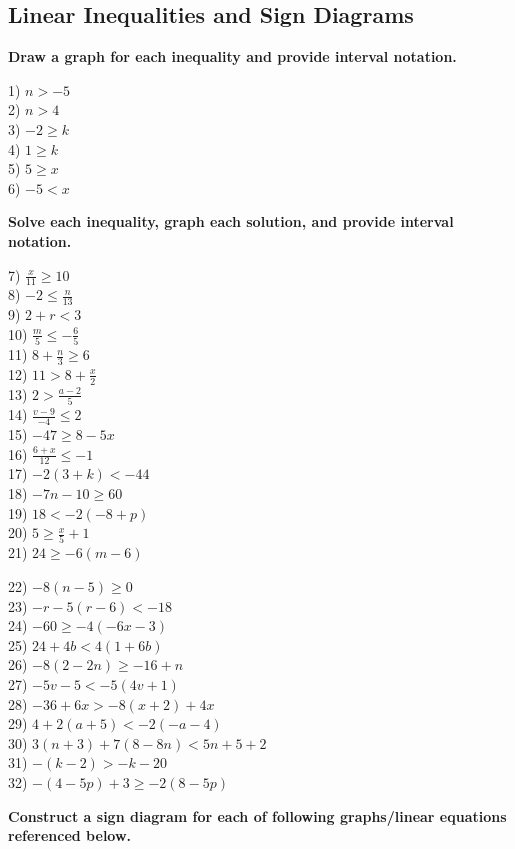 \documentclass[12pt]{book}
\theoremstyle{definition}
\begin{document}
\subsection*{Linear Inequalities and Sign Diagrams}
{\bf Draw a graph for each inequality and provide interval notation.}
\begin{multicols}{3}
  1) $n > - 5$\\
  2) $n > 4$\\
  3) $- 2 \geq k$\\
  4) $1 \geq k$\\
  5) $5 \geq x$\\
  6) $- 5 < x$
\end{multicols}
{\bf Solve each inequality, graph each solution, and provide interval
notation.}
\begin{multicols}{3}
  7) $\frac{x}{11} \geq 10$\\
  8) $- 2 \leq \frac{n}{13}$\\
  9) $2 + r < 3$\\
  10) $\frac{m}{5} \leq - \frac{6}{5}$\\
  11) $8 + \frac{n}{3} \geq 6$\\
  12) $11 > 8 + \frac{x}{2}$\\
  13) $2 > \frac{a - 2}{5}$\\
  14) $\frac{v - 9}{- 4} \leq 2$\\
  15) $- 47 \geq 8 - 5 x$\\
  16) $\frac{6 + x}{12} \leq - 1$\\
  17) $- 2 (3 + k) < - 44$\\
  18) $- 7 n - 10 \geq 60$\\
  19) $18 < - 2 (- 8 + p)$\\
  20) $5 \geq \frac{x}{5} + 1$\\
  21) $24 \geq - 6 (m - 6)$
\end{multicols}
\begin{multicols}{2}
	22) $- 8 (n - 5) \geq 0$\\
  23) $- r - 5 (r - 6) < - 18$\\
  24) $- 60 \geq - 4 (- 6 x - 3)$\\
  25) $24 + 4 b < 4 (1 + 6 b)$\\
  26) $- 8 (2 - 2 n) \geq - 16 + n$\\
  27) $- 5 v - 5 < - 5 (4 v + 1)$\\
  28) $- 36 + 6 x > - 8 (x + 2) + 4 x$\\
  29) $4 + 2 (a + 5) < - 2 (- a - 4)$\\
  30) $3 (n + 3) + 7 (8 - 8 n) < 5 n + 5 + 2$\\
  31) $- (k - 2) > - k - 20$\\
  32) $- (4 - 5 p) + 3 \geq - 2 (8 - 5 p)$ 
\end{multicols}
{\bf Construct a sign diagram for each of following graphs/linear equations referenced below.}\par
\end{document}
